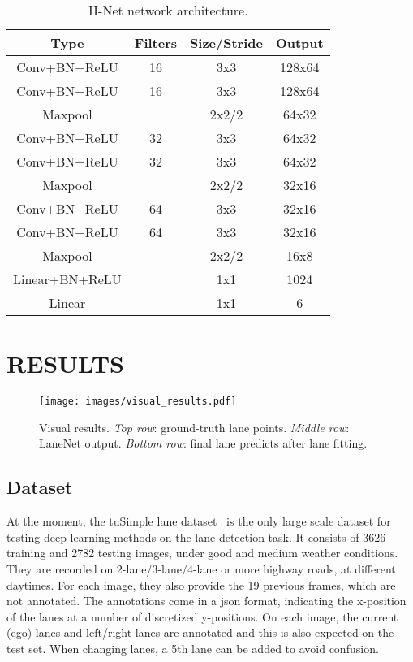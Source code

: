 \documentclass[letterpaper, 10 pt, conference]{ieeeconf}
\begin{document}
\begin{table}
\begin{center}
\begin{tabular}{c|c|c|c}
  	Type & Filters & Size/Stride & Output \\
  	\hline
	Conv+BN+ReLU & 16 & 3x3 & 128x64 \\
    Conv+BN+ReLU & 16 & 3x3 & 128x64 \\
 	Maxpool & & 2x2/2 & 64x32 \\
 	Conv+BN+ReLU & 32 & 3x3 &  64x32 \\   
	Conv+BN+ReLU & 32 & 3x3 & 64x32 \\
    Maxpool & & 2x2/2 & 32x16 \\
	Conv+BN+ReLU & 64 & 3x3 & 32x16 \\
	Conv+BN+ReLU & 64 & 3x3 & 32x16 \\
    Maxpool & & 2x2/2 & 16x8 \\   
    Linear+BN+ReLU & & 1x1 & 1024 \\
    \hline
    Linear & & 1x1 & 6 \\
\end{tabular}
\end{center}
\caption{H-Net network architecture.}
\label{tab:hnet_network}
\end{table}


\section{RESULTS}
\label{sec:results}

\begin{figure*}[t]
	\begin{center}
		\texttt{[image: images/visual\_results.pdf]}
	\end{center}
	\caption{Visual results. \emph{Top row}: ground-truth lane points. \emph{Middle row}: LaneNet output. \emph{Bottom row}: final lane predicts after lane fitting.}
	\label{fig:vis_results}
\end{figure*}

\subsection{Dataset}

At the moment, the tuSimple lane dataset~\cite{tusimple} is the only large scale dataset for testing deep learning methods on the lane detection task. It consists of 3626 training and 2782 testing images, under good and medium weather conditions. They are recorded on 2-lane/3-lane/4-lane or more highway roads, at different daytimes. For each image, they also provide the 19 previous frames, which are not annotated. The annotations come in a json format, indicating the x-position of the lanes at a number of discretized y-positions. On each image, the current (ego) lanes and left/right lanes are annotated and this is also expected on the test set. When changing lanes, a 5th lane can be added to avoid confusion. 
\end{document}
